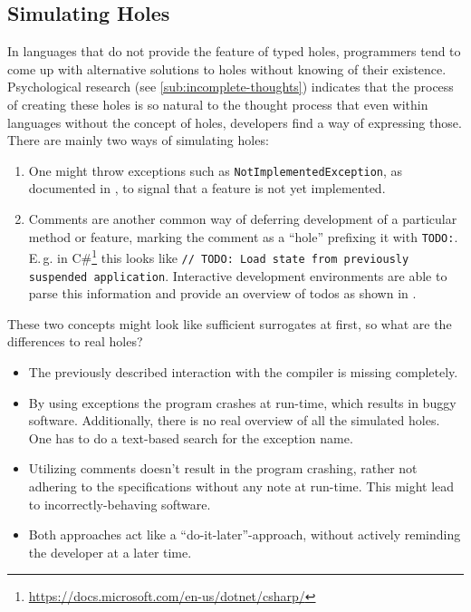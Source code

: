 \subsection{Simulating Holes}
In languages that do not provide the feature of typed holes, programmers tend to come up with alternative solutions to holes without knowing of their existence.
Psychological research (see \cref{sub:incomplete-thoughts}) indicates that the process of creating these holes is so natural to the thought process that even within languages without the concept of holes, developers find a way of expressing those.
There are mainly two ways of simulating holes:
\begin{enumerate}
\item One might throw exceptions such as \verb|NotImplementedException|, as documented in \textcite{microsoft_notimplementedexception_2020}, to signal that a feature is not yet implemented.
\item Comments are another common way of deferring development of a particular method or feature, marking the comment as a ``hole'' prefixing it with \verb|TODO:|. E.\,g. in C\#\footnote{\url{https://docs.microsoft.com/en-us/dotnet/csharp/}} this looks like \verb|// TODO: Load state from previously suspended application|. Interactive development environments are able to parse this information and provide an overview of todos as shown in \textcite{hogensen_use_2019}.
\end{enumerate}
These two concepts might look like sufficient surrogates at first, so what are the differences to real holes?
\begin{itemize}
    \item The previously described interaction with the compiler is missing completely.
    \item By using exceptions the program crashes at run-time, which results in buggy software. Additionally, there is no real overview of all the simulated holes. One has to do a text-based search for the exception name.
    \item Utilizing comments doesn't result in the program crashing, rather not adhering to the specifications without any note at run-time. This might lead to incorrectly-behaving software.
    \item Both approaches act like a ``do-it-later''-approach, without actively reminding the developer at a later time.
\end{itemize}


